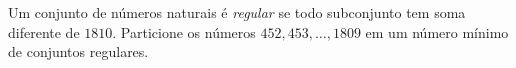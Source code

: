 Um conjunto de números naturais é \textit{regular} se todo subconjunto tem soma diferente de $1810$. Particione os números $452, 453, \dots, 1809$ em um número mínimo de conjuntos regulares.
